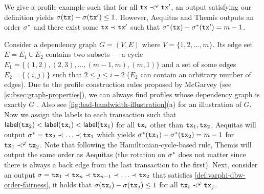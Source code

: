 \begin{example}
    We give a profile example \profileSet such that for all $\mathtt{tx} \prec^\varphi \mathtt{tx}'$, an output \orderOutput satisfying our definition yields $\sigma(\mathtt{tx}) - \sigma(\mathtt{tx}') \le 1$.
    However, \textsf{Aequitas} and \textsf{Themis} outputs an order $\sigma^\ast$ and there exist some $\mathtt{tx} \prec \mathtt{tx}'$ such that $\sigma^\ast(\mathtt{tx}) - \sigma^\ast(\mathtt{tx}') = m - 1$.

    Consider a dependency graph $G = (V, E)$ where $V = \{ 1, 2, \ldots, m \}$.
    Its edge set $E = E_1 \cup E_2$ contains two subsets --- a cycle $E_1 = \{(1, 2), (2, 3), \ldots, (m - 1, m), (m, 1)\}$ and a set of some edges $E_2 = \{ (i, j) \}$ such that $2 \le j \le i - 2$ ($E_2$ can contain an arbitrary number of edges).
    Due to the profile construction rules proposed by McGarvey \cite{McGarvey53} (see \cref{subsec:graph-properties}), we can always find profiles whose dependency graph is exactly $G$ .
    Also see \cref{fig:bad-bandwidth-illustration}(a) for an illustration of $G$.
    Now we assign the labels to each transaction such that $\mathsf{label}(\mathtt{tx}_2) < \mathsf{label}(\mathtt{tx}_i) < \mathsf{label}(\mathtt{tx}_1)$ for all $\mathtt{tx}_i$ other than $\mathtt{tx}_1, \mathtt{tx}_2$, \textsf{Aequitas} will output $\sigma^\ast = \mathtt{tx}_2 \prec \ldots \prec \mathtt{tx}_1$ which yields $\sigma^\ast(\mathtt{tx}_1) - \sigma^\ast(\mathtt{tx}_2) = m - 1$ for $\mathtt{tx}_1 \prec^\varphi \mathtt{tx}_2$.
    Note that following the Hamiltonian-cycle-based rule, \textsf{Themis} will output the same order as \textsf{Aequitas} (the rotation on $\sigma^\ast$ does not matter since there is always a back edge from the last transaction to the first).
    Next, consider an output $\sigma = \mathtt{tx}_1 \prec \mathtt{tx}_n \prec \mathtt{tx}_{n - 1} \prec \ldots \prec \mathtt{tx}_2$ that satisfies \cref{def:varphi-dbw-order-fairness}, it holds that $\sigma(\mathtt{tx}_i) - \sigma(\mathtt{tx}_j) \le 1$ for all  $\mathtt{tx}_i \prec^\varphi \mathtt{tx}_j$.
\end{example}

